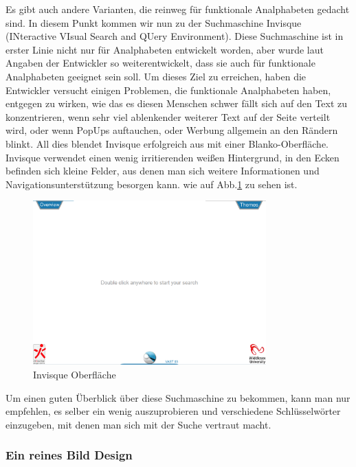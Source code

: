 Es gibt auch andere Varianten, die reinweg für funktionale Analphabeten gedacht sind. In diesem Punkt kommen wir nun zu der Suchmaschine Invisque (INteractive VIsual Search and QUery Environment). Diese Suchmaschine ist in erster Linie nicht nur für Analphabeten entwickelt worden, aber wurde laut Angaben der Entwickler so weiterentwickelt, dass sie auch für funktionale Analphabeten geeignet sein soll. Um dieses Ziel zu erreichen, haben die Entwickler versucht einigen Problemen, die funktionale Analphabeten haben, entgegen zu wirken, wie das es diesen Menschen schwer fällt sich auf den Text zu konzentrieren, wenn sehr viel ablenkender weiterer Text auf der Seite verteilt wird, oder wenn PopUps auftauchen, oder Werbung allgemein an den Rändern blinkt. All dies blendet Invisque erfolgreich aus mit einer Blanko-Oberfläche. Invisque verwendet einen wenig irritierenden weißen Hintergrund, in den Ecken befinden sich kleine Felder, aus denen man sich weitere Informationen und Navigationsunterstützung besorgen kann. wie auf Abb.\ref{fig:Invisque} zu sehen ist.


\begin{figure}[h]
	\centering
		\includegraphics[width=0.80\textwidth]{Daten/Inisque.PNG}
	\caption{Invisque Oberfläche}
	\label{fig:Invisque}
\end{figure}

Um einen guten Überblick über diese Suchmaschine zu bekommen, kann man nur empfehlen, es selber ein wenig auszuprobieren und verschiedene Schlüsselwörter einzugeben, mit denen man sich mit der Suche vertraut macht.

\subsubsection{Ein reines Bild Design}

